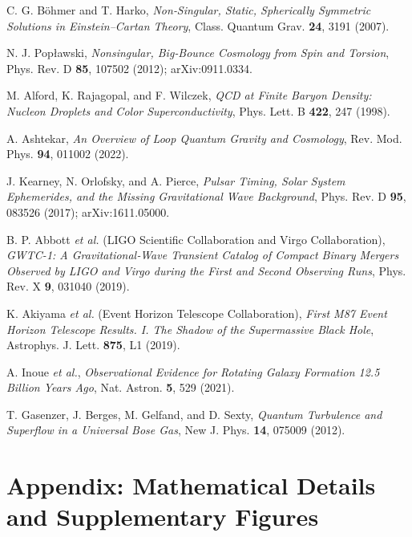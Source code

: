 \documentclass{article}
\begin{document}
\begin{thebibliography}{99}
  C. G. Böhmer and T. Harko,  
  \emph{Non‐Singular, Static, Spherically Symmetric Solutions in Einstein–Cartan Theory},  
  Class. Quantum Grav. \textbf{24}, 3191 (2007).

  N. J. Popławski,  
  \emph{Nonsingular, Big‐Bounce Cosmology from Spin and Torsion},  
  Phys. Rev. D \textbf{85}, 107502 (2012); arXiv:0911.0334.

  M. Alford, K. Rajagopal, and F. Wilczek,  
  \emph{QCD at Finite Baryon Density: Nucleon Droplets and Color Superconductivity},  
  Phys. Lett. B \textbf{422}, 247 (1998).

  A. Ashtekar,  
  \emph{An Overview of Loop Quantum Gravity and Cosmology},  
  Rev. Mod. Phys. \textbf{94}, 011002 (2022).

  J. Kearney, N. Orlofsky, and A. Pierce,  
  \emph{Pulsar Timing, Solar System Ephemerides, and the Missing Gravitational Wave Background},  
  Phys. Rev. D \textbf{95}, 083526 (2017); arXiv:1611.05000.

  B. P. Abbott \emph{et al.} (LIGO Scientific Collaboration and Virgo Collaboration),  
  \emph{GWTC-1: A Gravitational‐Wave Transient Catalog of Compact Binary Mergers Observed by LIGO and Virgo during the First and Second Observing Runs},  
  Phys. Rev. X \textbf{9}, 031040 (2019).

  K. Akiyama \emph{et al.} (Event Horizon Telescope Collaboration),  
  \emph{First M87 Event Horizon Telescope Results. I. The Shadow of the Supermassive Black Hole},  
  Astrophys. J. Lett. \textbf{875}, L1 (2019).

  A. Inoue \emph{et al.},  
  \emph{Observational Evidence for Rotating Galaxy Formation 12.5 Billion Years Ago},  
  Nat. Astron. \textbf{5}, 529 (2021).

  T. Gasenzer, J. Berges, M. Gelfand, and D. Sexty,  
  \emph{Quantum Turbulence and Superflow in a Universal Bose Gas},  
  New J. Phys. \textbf{14}, 075009 (2012).
\end{thebibliography}

\appendix
\section{Appendix: Mathematical Details and Supplementary Figures}
\label{sec:appendix}
\end{document}
